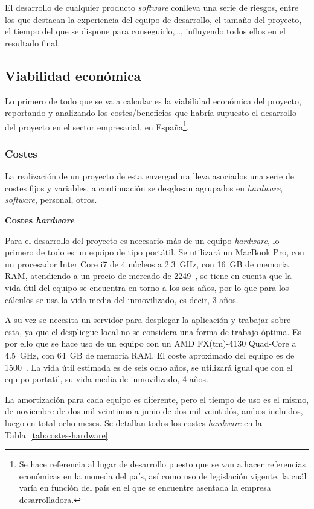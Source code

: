 El desarrollo de cualquier producto \textit{software} conlleva una serie de riesgos, entre los que destacan la experiencia del equipo de desarrollo, el tamaño del proyecto, el tiempo del que se dispone para conseguirlo,\dots, influyendo todos ellos en el resultado final.
\subsection{Viabilidad económica}
Lo primero de todo que se va a calcular es la viabilidad económica del proyecto, reportando y analizando los costes/beneficios que habría supuesto el desarrollo del proyecto en el sector empresarial, en España\footnote{Se hace referencia al lugar de desarrollo puesto que se van a hacer referencias económicas en la moneda del país, así como uso de legislación vigente, la cuál varía en función del país en el que se encuentre asentada la empresa desarrolladora.}.

\subsubsection{Costes}
La realización de un proyecto de esta envergadura lleva asociados una serie de costes fijos y variables, a continuación se desglosan agrupados en \textit{hardware}, \textit{software}, personal, otros.

\textbf{Costes \textit{hardware}}

Para el desarrollo del proyecto es necesario más de un equipo \textit{hardware}, lo primero de todo es un equipo de tipo portátil. Se utilizará un MacBook Pro, con un procesador Inter Core i7 de 4 núcleos a 2.3~GHz, con 16~GB de memoria RAM, atendiendo a un precio de mercado de 2249~\officialeuro, se tiene en cuenta que la vida útil del equipo se encuentra en torno a los seis años, por lo que para los cálculos se usa la vida media del inmovilizado, es decir, 3 años. 

A su vez se necesita un servidor para desplegar la aplicación y trabajar sobre esta, ya que el despliegue local no se considera una forma de trabajo óptima. Es por ello que se hace uso de un equipo con un AMD FX(tm)-4130 Quad-Core a 4.5~GHz, con 64~GB de memoria RAM. El coste aproximado del equipo es de 1500~\officialeuro. La vida útil estimada es de seis ocho años, se utilizará igual que con el equipo portatil, su vida media de inmovilizado, 4 años.

La amortización para cada equipo es diferente, pero el tiempo de uso es el mismo, de noviembre de dos mil veintiuno a junio de dos mil veintidós, ambos incluidos, luego en total ocho meses. Se detallan todos los costes \textit{hardware} en la Tabla~\ref{tab:costes-hardware}.


